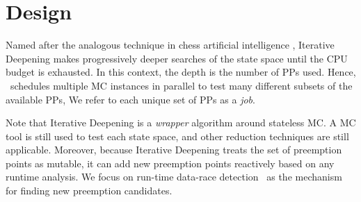 \section{Design}
\label{sec:design}

Named after the analogous technique in chess artificial intelligence \cite{iterative-deepening-chess-ai},
Iterative Deepening
makes progressively deeper searches of the state space until the CPU budget is exhausted.
In this context, the depth is the number of PPs used.
Hence,
\quicksand~schedules multiple MC instances in parallel to
test many different subsets of the available PPs,
We refer to each unique set of PPs as a {\em job}.

Note that Iterative Deepening is a {\em wrapper} algorithm around stateless MC.
A MC tool is still used to test each state space, and other reduction techniques are still applicable.
Moreover, because Iterative Deepening treats the set of preemption points as mutable,
it can add new preemption points reactively based on any runtime analysis.
We focus on run-time data-race detection~\cite{hybriddatarace,tsan,ifrit} as the mechanism for finding new preemption candidates.


